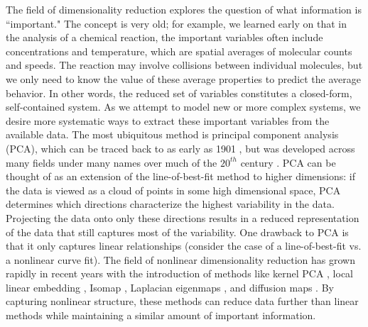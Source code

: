\documentclass[12pt]{article}
\begin{document}
The field of dimensionality reduction explores the question of what information is ``important." The concept is very old; for example, we learned early on that in the analysis of a chemical reaction, the important variables often include concentrations and temperature, which are spatial averages of molecular counts and speeds. The reaction may involve collisions between individual molecules, but we only need to know the value of these average properties to predict the average behavior. In other words, the reduced set of variables constitutes a closed-form, self-contained system. As we attempt to model new or more complex systems, we desire more systematic ways to extract these important variables from the available data. The most ubiquitous method is principal component analysis (PCA), which can be traced back to as early as 1901 \cite{Pearson1901}, but was developed across many fields under many names over much of the $20^{th}$ century \cite{Hotelling1933, Sirovich1987}. PCA can be thought of as an extension of the line-of-best-fit method to higher dimensions: if the data is viewed as a cloud of points in some high dimensional space, PCA determines which directions characterize the highest variability in the data. Projecting the data onto only these directions results in a reduced representation of the data that still captures most of the variability. One drawback to PCA is that it only captures linear relationships (consider the case of a line-of-best-fit vs. a nonlinear curve fit). The field of nonlinear dimensionality reduction has grown rapidly in recent years with the introduction of methods like kernel PCA \cite{Scholkopf1998}, local linear embedding \cite{Roweis2000}, Isomap \cite{Tenenbaum2000}, Laplacian eigenmaps \cite{Belkin2003}, and diffusion maps \cite{Coifman2005, Coifman2005a, Coifman2006}. By capturing nonlinear structure, these methods can reduce data further than linear methods while maintaining a similar amount of important information. \vspace{1mm}
\end{document}
